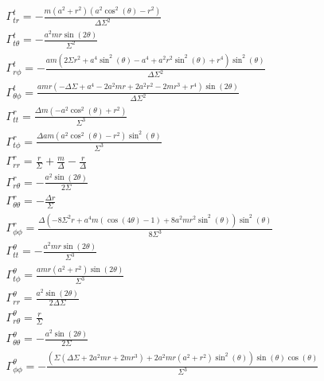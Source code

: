 \documentclass[10pt,a4paper]{report}
\begin{document}
\small\begin{align*}
\Gamma^t_{tr} = - \frac{m \left(a^{2} + r^{2}\right) \left(a^{2} \cos^{2}{\left(\theta \right)} - r^{2}\right)}{\Delta \Sigma^{2}}\\
\Gamma^t_{t\theta} = - \frac{a^{2} m r \sin{\left(2 \theta \right)}}{\Sigma^{2}}\\
\Gamma^t_{r\phi} = - \frac{a m \left(2 \Sigma r^{2} + a^{4} \sin^{2}{\left(\theta \right)} - a^{4} + a^{2} r^{2} \sin^{2}{\left(\theta \right)} + r^{4}\right) \sin^{2}{\left(\theta \right)}}{\Delta \Sigma^{2}}\\
\Gamma^t_{\theta\phi} = \frac{a m r \left(- \Delta \Sigma + a^{4} - 2 a^{2} m r + 2 a^{2} r^{2} - 2 m r^{3} + r^{4}\right) \sin{\left(2 \theta \right)}}{\Delta \Sigma^{2}}\\
\Gamma^r_{tt} = \frac{\Delta m \left(- a^{2} \cos^{2}{\left(\theta \right)} + r^{2}\right)}{\Sigma^{3}}\\
\Gamma^r_{t\phi} = \frac{\Delta a m \left(a^{2} \cos^{2}{\left(\theta \right)} - r^{2}\right) \sin^{2}{\left(\theta \right)}}{\Sigma^{3}}\\
\Gamma^r_{rr} = \frac{r}{\Sigma} + \frac{m}{\Delta} - \frac{r}{\Delta}\\
\Gamma^r_{r\theta} = - \frac{a^{2} \sin{\left(2 \theta \right)}}{2 \Sigma}\\
\Gamma^r_{\theta\theta} = - \frac{\Delta r}{\Sigma}\\
\Gamma^r_{\phi\phi} = \frac{\Delta \left(- 8 \Sigma^{2} r + a^{4} m \left(\cos{\left(4 \theta \right)} - 1\right) + 8 a^{2} m r^{2} \sin^{2}{\left(\theta \right)}\right) \sin^{2}{\left(\theta \right)}}{8 \Sigma^{3}}\\
\Gamma^\theta_{tt} = - \frac{a^{2} m r \sin{\left(2 \theta \right)}}{\Sigma^{3}}\\
\Gamma^\theta_{t\phi} = \frac{a m r \left(a^{2} + r^{2}\right) \sin{\left(2 \theta \right)}}{\Sigma^{3}}\\
\Gamma^\theta_{rr} = \frac{a^{2} \sin{\left(2 \theta \right)}}{2 \Delta \Sigma}\\
\Gamma^\theta_{r\theta} = \frac{r}{\Sigma}\\
\Gamma^\theta_{\theta\theta} = - \frac{a^{2} \sin{\left(2 \theta \right)}}{2 \Sigma}\\
\Gamma^\theta_{\phi\phi} = - \frac{\left(\Sigma \left(\Delta \Sigma + 2 a^{2} m r + 2 m r^{3}\right) + 2 a^{2} m r \left(a^{2} + r^{2}\right) \sin^{2}{\left(\theta \right)}\right) \sin{\left(\theta \right)} \cos{\left(\theta \right)}}{\Sigma^{3}}\\

\end{align*}
\end{document}
